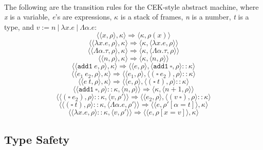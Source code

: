 \documentclass[12pt]{article}
\begin{document}
\paragraph{}
The following are the transition rules for the CEK-style abstract machine, where \emph{x} is a variable, \emph{e}'s are expressions, $\kappa$ is a stack of frames, \emph{n} is a number, \emph{t} is a type, and $v := n \ | \ \lambda x.e \ | \ \Lambda \alpha.e$:
$$\langle \langle x , \rho \rangle , \kappa \rangle \Rightarrow \langle \kappa , \rho(x) \rangle$$
$$\langle \langle \lambda x.e , \rho \rangle , \kappa \rangle \Rightarrow \langle \kappa ,  \langle \lambda x.e , \rho \rangle \rangle$$
$$\langle \langle \Lambda \alpha.\tau , \rho \rangle , \kappa \rangle \Rightarrow \langle \kappa ,  \langle \Lambda \alpha.\tau , \rho \rangle \rangle$$
$$\langle \langle n , \rho \rangle , \kappa \rangle \Rightarrow \langle \kappa ,  \langle n , \rho \rangle \rangle$$
$$\langle \langle \texttt{add1} \ e , \rho \rangle , \kappa \rangle \Rightarrow \langle \langle e , \rho \rangle , \langle \texttt{add1} \ \square , \rho \rangle :: \kappa \rangle$$
$$\langle \langle e_1 \ e_2 , \rho \rangle , \kappa \rangle \Rightarrow \langle \langle e_1 , \rho \rangle , \langle ( \square \ e_2), \rho \rangle  :: \kappa \rangle$$
$$\langle \langle e \ t , \rho \rangle , \kappa \rangle \Rightarrow \langle \langle e , \rho \rangle , \langle ( \square \ t), \rho \rangle  :: \kappa \rangle$$
$$\langle \langle \texttt{add1} \ \square , \rho \rangle :: \kappa , \langle n , \rho \rangle \rangle \Rightarrow \langle \kappa , \langle n + 1 , \rho \rangle \rangle$$
$$\langle \langle (\square \ e_2), \rho \rangle :: \kappa , \langle v , \rho' \rangle \rangle \Rightarrow \langle \langle e_2 , \rho \rangle, \langle (v \ \square) , \rho \rangle :: \kappa \rangle$$
$$\langle \langle (\square \ t), \rho \rangle :: \kappa , \langle \Lambda \alpha.e , \rho' \rangle \rangle \Rightarrow \langle \langle e , \rho'[\alpha = t] \rangle, \kappa \rangle$$
$$\langle \langle \lambda x.e, \rho \rangle :: \kappa , \langle v , \rho' \rangle \rangle \Rightarrow \langle \langle e , \rho[x = v] \rangle, \kappa \rangle$$

\subsection{Type Safety}
\end{document}
